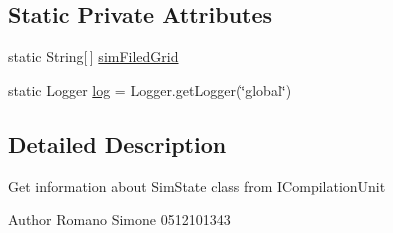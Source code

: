 \subsection*{Static Private Attributes}
\begin{DoxyCompactItemize}
\item 
static String\mbox{[}$\,$\mbox{]} \hyperlink{classit_1_1isislab_1_1masonassisteddocumentation_1_1mason_1_1analizer_1_1_sim_state_analizer_af21adec0b3c44f8bfc09cd83d6eeb917}{sim\-Filed\-Grid}
\item 
static Logger \hyperlink{classit_1_1isislab_1_1masonassisteddocumentation_1_1mason_1_1analizer_1_1_sim_state_analizer_acec7226fdf376622213474dea1ee66f4}{log} = Logger.\-get\-Logger(\char`\"{}global\char`\"{})
\end{DoxyCompactItemize}


\subsection{Detailed Description}
Get information about Sim\-State class from I\-Compilation\-Unit \begin{DoxyAuthor}{Author}
Romano Simone 0512101343 
\end{DoxyAuthor}


